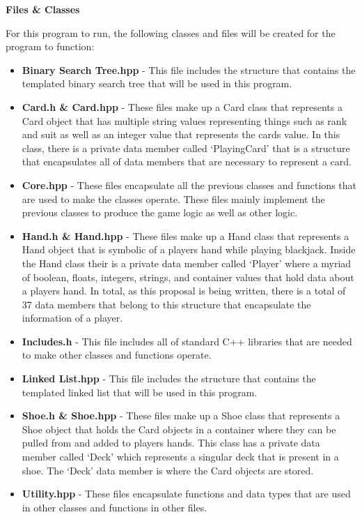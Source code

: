 \documentclass[a4paper,9pt]{article}
\begin{document}
\noindent \textbf{Files \& Classes} \newline

For this program to run, the following classes and files will be created for the program to function:

\begin{itemize}
    \item \textbf{Binary Search Tree.hpp} - This file includes the structure that contains the templated binary search tree that will be used in this program.
    \item \textbf{Card.h \& Card.hpp} - These files make up a Card class that represents a Card object that has multiple string values representing things such as rank and suit as well as an integer value
    that represents the cards value. In this class, there is a private data member called `PlayingCard' that is a structure that encapsulates all of data members that are necessary to represent a card.
    \item \textbf{Core.hpp} - These files encapsulate all the previous classes and functions that are used to make the classes operate. These files mainly implement the previous classes to produce
    the game logic as well as other logic.
    \item \textbf{Hand.h \& Hand.hpp} - These files make up a Hand class that represents a Hand object that is symbolic of a players hand while playing blackjack. Inside the Hand class their is a private
    data member called `Player' where a myriad of boolean, floats, integers, strings, and container values that hold data about a players hand. In total, as this proposal is being written, there is a total
    of 37 data members that belong to this structure that encapsulate the information of a player.
    \item \textbf{Includes.h} - This file includes all of standard C++ libraries that are needed to make other classes and functions operate.
    \item \textbf{Linked List.hpp} - This file includes the structure that contains the templated linked list that will be used in this program.
    \item \textbf{Shoe.h \& Shoe.hpp} - These files make up a Shoe class that represents a Shoe object that holds the Card objects in a container where they can be pulled from and added to players hands. 
    This class has a private data member called `Deck' which represents a singular deck that is present in a shoe. The `Deck' data member is where the Card objects are stored.
    \item \textbf{Utility.hpp} - These files encapsulate functions and data types that are used in other classes and functions in other files.
\end{itemize}
\end{document}
